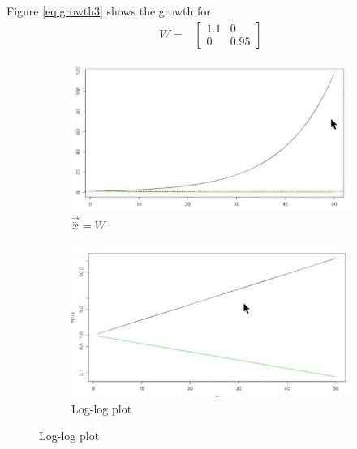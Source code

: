 \documentclass[]{article}
\begin{document}
Figure \ref{eq:growth3} shows the growth for
\begin{align*}
	W=&\begin{bmatrix}
		1.1&0\\
		0&0.95
	\end{bmatrix}
\end{align*}

\begin{figure}[H]
	\begin{center}
		\caption[Growth of $\vec{\dot{x}} = W \vec{x}$]{Growth of $\vec{\dot{x}} = W \vec{x}$: type 1 takes over the population!}\label{eq:growth3}
		\begin{subfigure}[t]{0.45\textwidth}
			\caption{$\vec{\dot{x}} = W $}
			\includegraphics[width=\textwidth]{growth3}
		\end{subfigure}
		\;\;
		\begin{subfigure}[t]{0.45\textwidth}
			\caption{Log-log plot}
			\includegraphics[width=\textwidth]{growth3-log-log}
		\end{subfigure}
	\end{center}
\end{figure}
\end{document}
